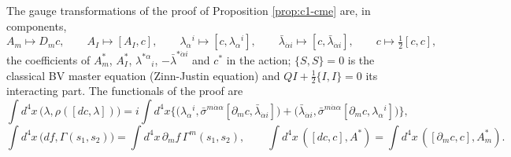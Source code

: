 \begin{remark}
The gauge transformations of the proof of Proposition \ref{prop:c1-cme} are, in components,
\[
A_m\mapsto D_mc,\qquad A_I\mapsto[A_I,c],\qquad \lambda_\alpha{}^i\mapsto[c,\lambda_\alpha{}^i],\qquad \bar\lambda_{\dot\alpha i}\mapsto[c,\bar\lambda_{\dot\alpha i}],\qquad c\mapsto\tfrac12[c,c],
\]
the coefficients of $A^*_m$, $A^*_I$, $\lambda^{*\alpha}{}_i$, $-\bar\lambda^{*\dot\alpha i}$ and $c^*$ in the action; $\{S,S\}=0$ is the classical BV master equation (Zinn-Justin equation) and $QI+\tfrac12\{I,I\}=0$ its interacting part. The functionals of the proof are
\[
\int d^4x\,\big(\lambda,\rho([dc,\lambda])\big)=i\int d^4x\Big\{\big(\lambda_\alpha{}^i,\bar\sigma^{m\dot\alpha\alpha}[\partial_mc,\bar\lambda_{\dot\alpha i}]\big)+\big(\bar\lambda_{\dot\alpha i},\bar\sigma^{m\dot\alpha\alpha}[\partial_mc,\lambda_\alpha{}^i]\big)\Big\},
\]
\[
\int d^4x\,\big(df,\Gamma(s_1,s_2)\big)=\int d^4x\,\partial_mf\,\Gamma^m(s_1,s_2),\qquad \int d^4x\,([dc,c],A^*)=\int d^4x\,([\partial_mc,c],A^*_m).
\]
\end{remark}

